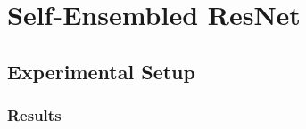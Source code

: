 \documentclass[a4paper, oneside]{discothesis}
\begin{document}
% 
% 

\section{Self-Ensembled ResNet}

\subsection{Experimental Setup}

\subsubsection{Results}








\bigskip



\end{document}
